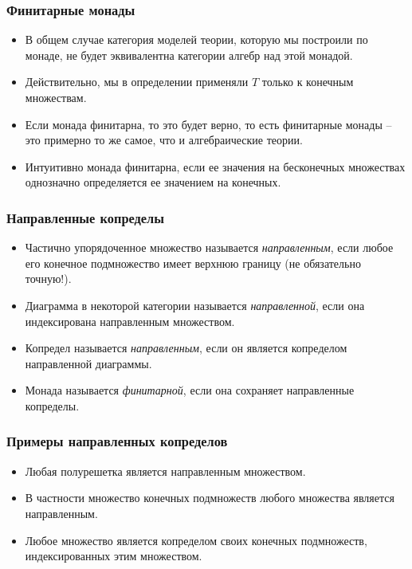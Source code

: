 \documentclass{beamer}
\theoremstyle{definition}
\begin{document}
\begin{frame}
\frametitle{Финитарные монады}
\begin{itemize}
\item В общем случае категория моделей теории, которую мы построили по монаде, не будет эквивалентна категории алгебр над этой монадой.
\item Действительно, мы в определении применяли $T$ только к конечным множествам.
\item Если монада финитарна, то это будет верно, то есть финитарные монады -- это примерно то же самое, что и алгебраические теории.
\item Интуитивно монада финитарна, если ее значения на бесконечных множествах однозначно определяется ее значением на конечных.
\end{itemize}
\end{frame}

\begin{frame}
\frametitle{Направленные копределы}
\begin{itemize}
\item Частично упорядоченное множество называется \emph{направленным}, если любое его конечное подмножество имеет верхнюю границу (не обязательно точную!).
\item Диаграмма в некоторой категории называется \emph{направленной}, если она индексирована направленным множеством.
\item Копредел называется \emph{направленным}, если он является копределом направленной диаграммы.
\item Монада называется \emph{финитарной}, если она сохраняет направленные копределы.
\end{itemize}
\end{frame}

\begin{frame}
\frametitle{Примеры направленных копределов}
\begin{itemize}
\item Любая полурешетка является направленным множеством.
\item В частности множество конечных подмножеств любого множества является направленным.
\item Любое множество является копределом своих конечных подмножеств, индексированных этим множеством.
\end{itemize}
\end{frame}
\end{document}
